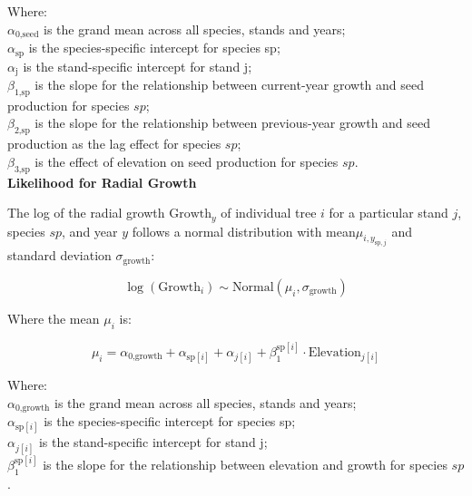 \documentclass[11pt,letter]{article}
\begin{document}
Where:\\
\(\alpha_{\text{0,seed}}\) is the grand mean across all species, stands and years;\\
\(\alpha_{\text{sp}}\) is the species-specific intercept for species sp;\\
\(\alpha_{\text{j}}\) is the stand-specific intercept for stand j;\\
\(\beta_{\text{1,sp}}\) is the slope for the relationship between current-year growth and seed production for species \(sp\);\\
\(\beta_{\text{2,sp}}\) is the slope for the relationship between previous-year growth and seed production as the lag effect for species \(sp\);\\
\(\beta_{\text{3,sp}}\) is the effect of elevation on seed production for species \(sp\).\\


\textbf{Likelihood for Radial Growth}

The log of the radial growth \(\text{Growth}_y\) of individual tree \(i\) for a particular stand \(j\), species \(sp\), and year \(y\) follows a normal distribution with mean\(\mu_{i, y_{\text{sp}, j}}\) and standard deviation \(\sigma_{\text{growth}}\):

\[
\log(\text{Growth}_i) \sim \text{Normal}(\mu_i, \sigma_{\text{growth}})
\]

Where the mean \(\mu_i\) is:

\[
\mu_i = \alpha_{\text{0,growth}} + \alpha_{\text{sp}[i]} + \alpha_{j[i]} + \beta^{\text{sp}[i]}_1 \cdot \text{Elevation}_{j[i]}
\]

Where:\\
\(\alpha_{\text{0,growth}}\) is the grand mean across all species, stands and years;\\
\(\alpha_{\text{sp}[i]}\) is the species-specific intercept for species sp;\\
\(\alpha_{j[i]}\) is the stand-specific intercept for stand j;\\
\(\beta^{\text{sp}[i]}_1\) is the slope for the relationship between elevation and growth for species \(sp\).\\
\end{document}

